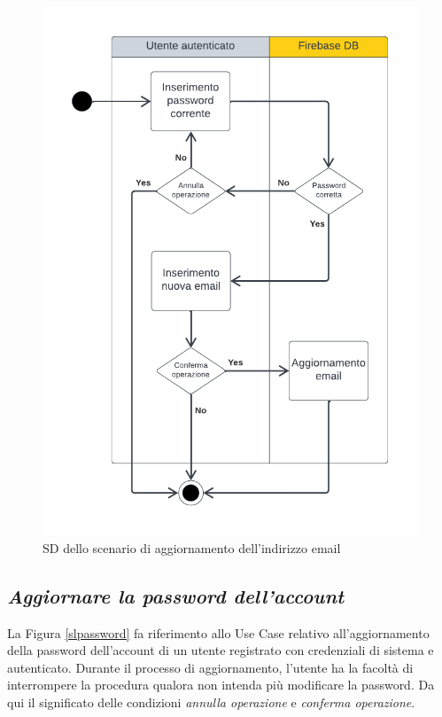 \documentclass[11pt, a4paper]{article}
\theoremstyle{definition} %
\begin{document}
\begin{figure}[H]
\centering
\includegraphics[scale = 0.9]{materiale/ucdiagrams/swimlaneemail.pdf}
\caption{SD dello scenario di aggiornamento dell'indirizzo email}
\label{slemail}
\end{figure}

\subsection*{\textit{Aggiornare la password dell'account}}
La Figura \ref{slpassword} fa riferimento allo Use Case relativo all'aggiornamento
della password dell'account di un utente registrato con credenziali di sistema e autenticato.
Durante il processo di aggiornamento, l'utente ha la facoltà di interrompere
la procedura qualora non intenda più modificare la password. Da qui il
significato delle condizioni \textit{annulla operazione} e \textit{conferma
operazione}.
\end{document}
